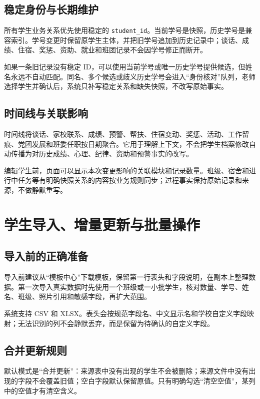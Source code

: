 \documentclass[UTF8,zihao=-4,oneside]{ctexrep}
\newcommand{\code}[1]{\texttt{\small #1}}
\begin{document}
\section{稳定身份与长期维护}

所有学生业务关系优先使用稳定的 \code{student\_id}。当前学号是快照，历史学号是兼容索引。学号变更时保留原学生主体，并把旧学号追加到历史记录中；谈话、成绩、住宿、奖惩、资助、就业和班团记录不会因学号修正而断开。

如果一条旧记录没有稳定 ID，可以使用当前学号或唯一历史学号提供候选，但姓名永远不自动匹配。同名、多个候选或歧义历史学号会进入“身份核对”队列，老师选择学生并确认后，系统只补写稳定关系和缺失快照，不改写原始事实。

\section{时间线与关联影响}

时间线将谈话、家校联系、成绩、预警、帮扶、住宿变动、奖惩、活动、工作留痕、党团发展和班委任职按日期聚合。它用于理解上下文，不会把学生档案修改自动传播为对历史成绩、心理、纪律、资助和预警事实的改写。

编辑学生前，页面可以显示本次变更影响的关联模块和记录数量。班级、宿舍和进行中任务等有明确快照关系的内容按业务规则同步；过程事实保持原始记录和来源，不做静默重写。

\chapter{学生导入、增量更新与批量操作}

\section{导入前的正确准备}

导入前建议从“模板中心”下载模板，保留第一行表头和字段说明，在副本上整理数据。第一次导入真实数据时先使用一个班级或一小批学生，核对数量、学号、姓名、班级、照片引用和敏感字段，再扩大范围。

系统支持 CSV 和 XLSX。表头会按规范字段名、中文显示名和学校自定义字段映射；无法识别的列不会静默丢弃，而是保留为待确认的自定义字段。

\section{合并更新规则}

默认模式是“合并更新”：来源表中没有出现的学生不会被删除；来源文件中没有出现的字段不会覆盖旧值；空白字段默认保留原值。只有明确勾选“清空空值”，某列中的空值才有清空含义。
\end{document}
